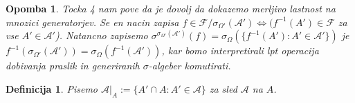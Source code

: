 \documentclass[a4paper,12pt]{article}
\newtheorem{definicija}{Definicija}
\newtheorem{opomba}{Opomba}
\newcommand{\F}{\mathcal{F}}
\newcommand{\A}{\mathcal{A}}
\begin{document}
            \begin{opomba}
                Tocka 4 nam pove da je dovolj da dokazemo  merljivo lastnost na mnozici generatorjev. Se en nacin zapisa $f \in \F/\sigma_{\Omega'}(\A') \iff (f^{-1}(A') \in \F$ za vse $A' \in \A'$). Natancno zapisemo $\sigma^{\sigma_{\Omega'}(\A')}(f) = \sigma_\Omega(\{f^{-1}(A'):A' \in \A'\})$ je $f^{-1}(\sigma_{\Omega'}(\A')) = \sigma_\Omega(f^{-1}(\A'))$, kar bomo interpretirali lpt operacija dobivanja praslik in generiranih $\sigma$-algeber komutirati.
            \end{opomba}

            \begin{definicija}
                Pisemo $\A|_A := \{A'\cap A : A'\in \A\}$ za sled $\A$ na $A$.
            \end{definicija}
\end{document}
